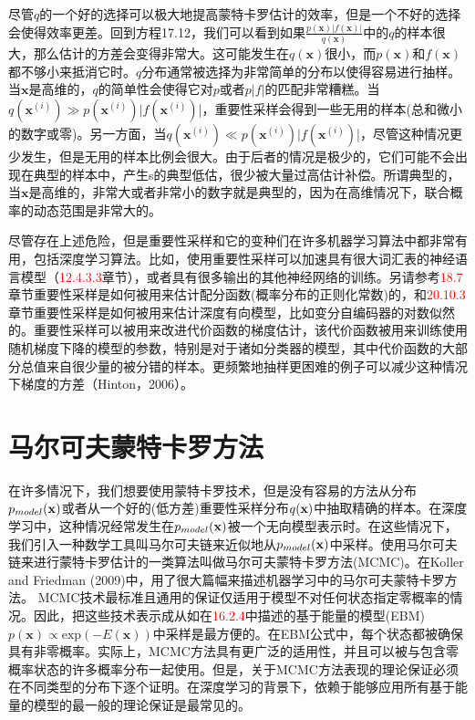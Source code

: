 尽管\(q\)的一个好的选择可以极大地提高蒙特卡罗估计的效率，但是一个不好的选择会使得效率更差。回到方程17.12，我们可以看到如果\( \frac { p(\bm{x})|f(\bm{x})| }{ q(\bm{x}) } \)中的\(q\)的样本很大，那么估计的方差会变得非常大。这可能发生在\(q(\bm{x})\)很小，而\(p(\bm{x})\)和\(f(\bm{x})\)都不够小来抵消它时。\(q\)分布通常被选择为非常简单的分布以使得容易进行抽样。当\(\bm{x}\)是高维的，\(q\)的简单性会使得它对\(p\)或者\(p|f|\)的匹配非常糟糕。当\(q({\bm{x}}^{ (i) })\gg p({\bm{x}}^{ (i) })|f({\bm{x}}^{ (i) })\)|，重要性采样会得到一些无用的样本(总和微小的数字或零)。另一方面，当\(q({\bm{x}}^{ (i) })\ll p({\bm{x}}^{ (i) })|f({\bm{x}}^{ (i) })\)|，尽管这种情况更少发生，但是无用的样本比例会很大。由于后者的情况是极少的，它们可能不会出现在典型的样本中，产生s的典型低估，很少被大量过高估计补偿。所谓典型的，当\(\bm{x}\)是高维的，非常大或者非常小的数字就是典型的，因为在高维情况下，联合概率的动态范围是非常大的。

尽管存在上述危险，但是重要性采样和它的变种们在许多机器学习算法中都非常有用，包括深度学习算法。比如，使用重要性采样可以加速具有很大词汇表的神经语言模型（\textcolor{red}{12.4.3.3}章节），或者具有很多输出的其他神经网络的训练。另请参考\textcolor{red}{18.7}章节重要性采样是如何被用来估计配分函数(概率分布的正则化常数)的，和\textcolor{red}{20.10.3}章节重要性采样是如何被用来估计深度有向模型，比如变分自编码器的对数似然的。重要性采样可以被用来改进代价函数的梯度估计，该代价函数被用来训练使用随机梯度下降的模型的参数，特别是对于诸如分类器的模型，其中代价函数的大部分总值来自很少量的被分错的样本。更频繁地抽样更困难的例子可以减少这种情况下梯度的方差（Hinton，2006）。

\section{马尔可夫蒙特卡罗方法}
在许多情况下，我们想要使用蒙特卡罗技术，但是没有容易的方法从分布\({ p }_{ model }(\bf{x})\)或者从一个好的(低方差)重要性采样分布\(q(\bf{x})\)中抽取精确的样本。在深度学习中，这种情况经常发生在\({ p }_{ model }(\bf{x})\)被一个无向模型表示时。在这些情况下，我们引入一种数学工具叫马尔可夫链来近似地从\({ p }_{ model }(\bf{x})\)中采样。使用马尔可夫链来进行蒙特卡罗估计的一类算法叫做马尔可夫蒙特卡罗方法(MCMC)。在Koller and Friedman (2009)中，用了很大篇幅来描述机器学习中的马尔可夫蒙特卡罗方法。
MCMC技术最标准且通用的保证仅适用于模型不对任何状态指定零概率的情况。因此，把这些技术表示成从如在\textcolor{red}{16.2.4}中描述的基于能量的模型(EBM) \(p(\bm{x})\propto \text{exp}(-E(\bm{x}))\)中采样是最方便的。在EBM公式中，每个状态都被确保具有非零概率。实际上，MCMC方法具有更广泛的适用性，并且可以被与包含零概率状态的许多概率分布一起使用。但是，关于MCMC方法表现的理论保证必须在不同类型的分布下逐个证明。在深度学习的背景下，依赖于能够应用所有基于能量的模型的最一般的理论保证是最常见的。

